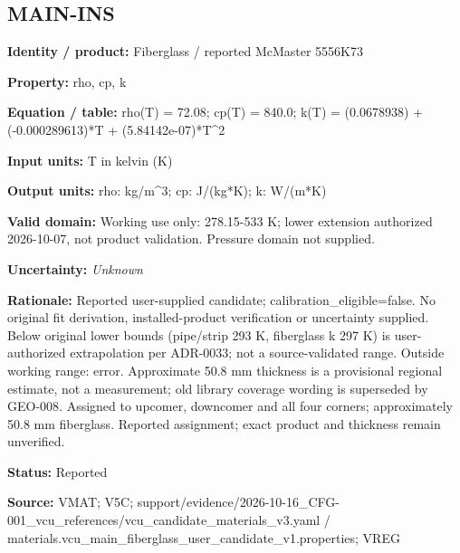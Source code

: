 \documentclass[11pt]{article}
\begin{document}
\par\noindent\begin{minipage}{\textwidth}\small\setlength{\parskip}{2pt}
\subsection*{MAIN-INS}
\textbf{Identity / product:} Fiberglass / reported McMaster 5556K73\par
\textbf{Property:} rho, cp, k\par
\textbf{Equation / table:} rho(T) = 72.08; cp(T) = 840.0; k(T) = (0.0678938) + (-0.000289613)*T + (5.84142e-07)*T\textasciicircum{}2\par
\textbf{Input units:} T in kelvin (K)\par
\textbf{Output units:} rho: kg/m\textasciicircum{}3; cp: J/(kg*K); k: W/(m*K)\par
\textbf{Valid domain:} Working use only: 278.15-533 K; lower extension authorized 2026-10-07, not product validation. Pressure domain not supplied.\par
\textbf{Uncertainty:} \textit{Unknown}\par
\textbf{Rationale:} Reported user-supplied candidate; calibration\_\allowbreak{}eligible=false. No original fit derivation, installed-product verification or uncertainty supplied. Below original lower bounds (pipe/strip 293 K, fiberglass k 297 K) is user-authorized extrapolation per ADR-0033; not a source-validated range. Outside working range: error. Approximate 50.8 mm thickness is a provisional regional estimate, not a measurement; old library coverage wording is superseded by GEO-008. Assigned to upcomer, downcomer and all four corners; approximately 50.8 mm fiberglass. Reported assignment; exact product and thickness remain unverified.\par
\textbf{Status:} Reported\par
\textbf{Source:} VMAT; V5C; support/evidence/2026-10-16\_\allowbreak{}CFG-001\_\allowbreak{}vcu\_\allowbreak{}references/vcu\_\allowbreak{}candidate\_\allowbreak{}materials\_\allowbreak{}v3.yaml / materials.vcu\_\allowbreak{}main\_\allowbreak{}fiberglass\_\allowbreak{}user\_\allowbreak{}candidate\_\allowbreak{}v1.properties; VREG\par
\end{minipage}\par\vspace{5pt}
\end{document}
